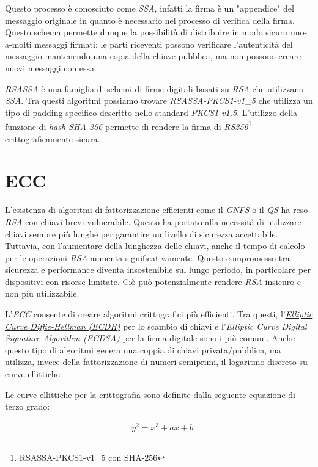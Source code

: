 Questo processo è conosciuto come \emph{\gls{SSA}}, infatti la firma è un "appendice" del messaggio originale in quanto è necessario nel processo di verifica della firma.
Questo schema permette dunque la possibilità di distribuire in modo sicuro uno-a-molti messaggi firmati: le parti riceventi possono verificare l'autenticità del messaggio mantenendo una copia della chiave pubblica, ma non possono creare nuovi messaggi con essa.

\emph{RSASSA} è una famiglia di schemi di firme digitali basati su \emph{RSA} che utilizzano \emph{SSA}.
Tra questi algoritmi possiamo trovare \emph{RSASSA-PKCS1-v1\_5} che utilizza un tipo di padding specifico descritto nello standard \emph{\gls{PKCS1} v1.5}.
L'utilizzo della funzione di \emph{hash SHA-256} permette di rendere la firma di \emph{RS256}\footnote{RSASSA-PKCS1-v1\_5 con SHA-256} crittograficamente sicura.

\section{ECC}
L'esistenza di algoritmi di fattorizzazione efficienti come il \emph{\gls{GNFS}} o il \emph{\gls{QS}} ha reso \emph{RSA} con chiavi brevi vulnerabile.
Questo ha portato alla necessità di utilizzare chiavi sempre più lunghe per garantire un livello di sicurezza accettabile.
Tuttavia, con l'aumentare della lunghezza delle chiavi, anche il tempo di calcolo per le operazioni \emph{RSA} aumenta significativamente.
Questo compromesso tra sicurezza e performance diventa insostenibile sul lungo periodo, in particolare per dispositivi con risorse limitate.
Ciò può potenzialmente rendere \emph{RSA} insicuro e non più utilizzabile.

L'\emph{ECC} consente di creare algoritmi crittografici più efficienti.
Tra questi, l'\emph{\hyperref[sec:ecdh]{Elliptic Curve Diffie-Hellman (ECDH)}} per lo scambio di chiavi e l'\emph{Elliptic Curve Digital Signature Algorithm (ECDSA)} per la firma digitale sono i più comuni.
Anche questo tipo di algoritmi genera una coppia di chiavi privata/pubblica, ma utilizza, invece della fattorizzazione di numeri semiprimi, il logaritmo discreto su curve ellittiche.

\noindent Le curve ellittiche per la crittografia sono definite dalla seguente equazione di terzo grado:

\begin{equation}
	\begin{aligned}
		&y^2 = x^3 + ax + b
	\end{aligned}
\end{equation}


